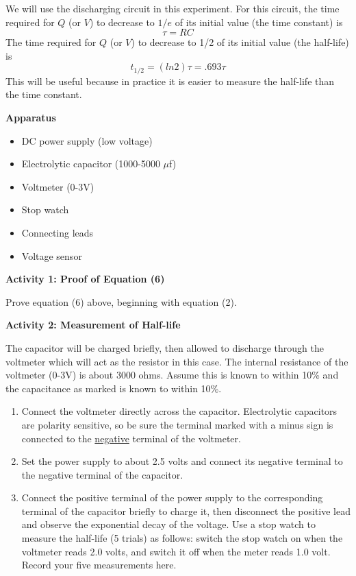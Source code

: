 We will use the discharging circuit in this experiment.
For this circuit, the time required for $Q$ (or $V$) to decrease to
$1/e$ of its initial value (the time constant) is
\begin{equation}
\tau=RC
\end{equation}
The time required for $Q$ (or $V$) to decrease to 1/2 of its initial value (the
half-life) is
\begin{equation}
t_{1/2}=(ln2)\tau =.693\tau
\end{equation}
This will be useful because in practice it is easier to measure the half-life
than the time constant.


\textbf{Apparatus}

\begin{itemize}
\item DC power supply (low voltage)
\item Electrolytic capacitor (1000-5000 $\mu$f)
\item Voltmeter (0-3V)
\item Stop watch
\item Connecting leads
\item Voltage sensor
\end{itemize}
\textbf{Activity 1: Proof of Equation (6)}

Prove equation (6) above, beginning with equation (2).
\vspace{3in}

\textbf{Activity 2: Measurement of Half-life}

The capacitor will be charged briefly, then allowed to discharge through the
voltmeter which will act as the resistor in this case. The internal resistance
of the voltmeter (0-3V) is about 3000 ohms.  Assume this is known to within
10\% and the capacitance as marked is known to within 10\%.

\begin{enumerate}
\item Connect the voltmeter directly across the capacitor.  Electrolytic
capacitors are polarity sensitive, so be sure the terminal marked with a minus
sign is connected to the \underline{negative} terminal of the voltmeter.

\item Set the power supply to about 2.5 volts and connect its negative terminal
to the negative terminal of the capacitor.

\item Connect the positive terminal of the power supply to the corresponding
terminal of the capacitor briefly to charge it, then disconnect the positive 
lead and observe the exponential decay of the voltage.  Use a stop watch to 
measure the half-life (5 trials) as follows: switch the stop watch on when the 
voltmeter reads 2.0 volts, and switch it off when the meter reads 1.0 volt. 
Record your five measurements here.\vspace{30mm}

\end{enumerate}

